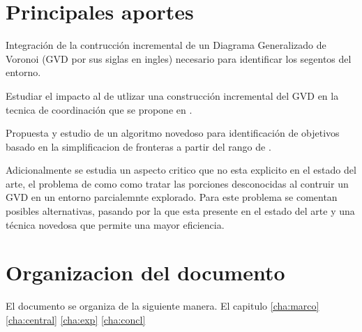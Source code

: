 \section{Principales aportes}

Integración de la contrucción incremental de un Diagrama Generalizado de
Voronoi (GVD por sus siglas en ingles) necesario para identificar los segentos
del entorno.

Estudiar el impacto al de utlizar una construcción incremental del GVD en la
tecnica de coordinación que se propone en \cite{wurm2008coordinated}. 

Propuesta y estudio de un algoritmo novedoso para identificación de objetivos
basado en la simplificacion de fronteras a partir del rango de .

Adicionalmente se estudia un aspecto critico que no esta explicito en el estado
del arte, el problema de como como tratar las porciones desconocidas al
contruir un GVD en un entorno parcialemnte explorado. Para este problema se
comentan posibles alternativas, pasando por la que esta presente en el estado
del arte y una técnica novedosa que permite una mayor eficiencia.

\section{Organizacion del documento}
El documento se organiza de la siguiente manera.
El capitulo \ref{cha:marco} \ref{cha:central} \ref{cha:exp} \ref{cha:concl}


